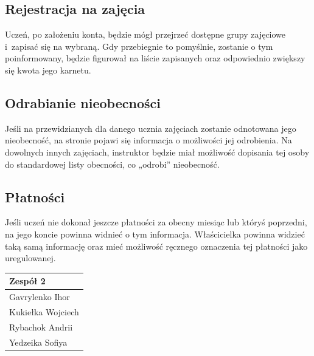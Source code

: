 \documentclass[12pt, a4paper]{article}
\begin{document}
\subsection{Rejestracja na zajęcia}
Uczeń, po założeniu konta, będzie mógł przejrzeć dostępne grupy zajęciowe
i~zapisać się na wybraną. Gdy przebiegnie to pomyślnie, zostanie o tym poinformowany,
będzie figurował na liście zapisanych oraz odpowiednio zwiększy się kwota jego karnetu.

\subsection{Odrabianie nieobecności}
Jeśli na przewidzianych dla danego ucznia zajęciach zostanie odnotowana
jego nieobecność,
na stronie pojawi się informacja o możliwości jej odrobienia.
Na dowolnych innych zajęciach, instruktor będzie miał możliwość dopisania tej osoby
do standardowej listy obecności, co „odrobi” nieobecność.

\subsection{Płatności}
Jeśli uczeń nie dokonał jeszcze płatności za obecny miesiąc lub któryś poprzedni,
na jego koncie powinna widnieć o tym informacja. Właścicielka powinna widzieć
taką samą informację oraz mieć możliwość ręcznego oznaczenia tej płatności
jako uregulowanej.

\raggedleft
\vspace{1em}
\begin{tabular}{l}
    Zespół 2 \\\hline
    \rule{0pt}{1.5em}Gavrylenko Ihor\\
    Kukiełka Wojciech\\
    Rybachok Andrii\\
    Yedzeika Sofiya
\end{tabular}
\end{document}
